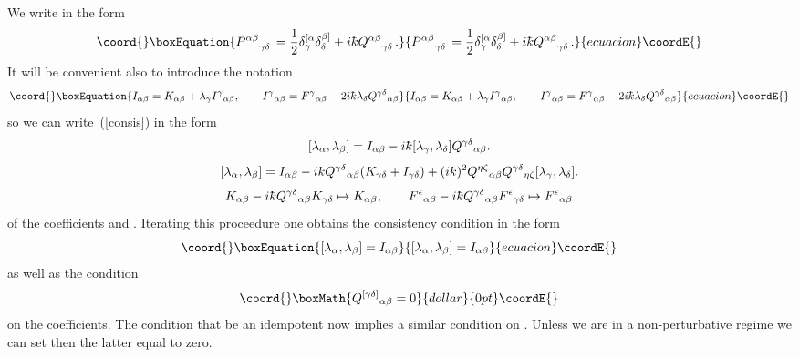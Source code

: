 \documentclass[12pt,a4paper]{article}
\newcounter{eg}
\def\kbar{{\mathchar'26\mkern-9muk}}
\begin{document}
We write \coordHE{} in the form
\begin{equation}\coord{}\boxEquation{
P^{\alpha\beta}{}^{\phantom{\alpha\beta}}_{\gamma\delta} = 
\frac 12 \delta^{[\alpha}_\gamma \delta^{\beta]}_\delta +
i\kbar Q^{\alpha\beta}{}^{\phantom{\alpha\beta}}_{\gamma\delta}.     \label{P}
}{
P^{\alpha\beta}{}^{\phantom{\alpha\beta}}_{\gamma\delta} = 
\frac 12 \delta^{[\alpha}_\gamma \delta^{\beta]}_\delta +
i\kbar Q^{\alpha\beta}{}^{\phantom{\alpha\beta}}_{\gamma\delta}.     }{ecuacion}\coordE{}\end{equation}
It will be convenient also to introduce the notation
\begin{equation}\coord{}\boxEquation{
I_{\alpha\beta} = 
K_{\alpha\beta} + \lambda_\gamma I^\gamma{}_{\alpha\beta}, \qquad
I^\gamma{}_{\alpha\beta} = F^\gamma{}_{\alpha\beta} - 
2i\kbar\lambda_\delta Q^{\gamma\delta}{}_{\alpha\beta}          \label{Gab}
}{
I_{\alpha\beta} = 
K_{\alpha\beta} + \lambda_\gamma I^\gamma{}_{\alpha\beta}, \qquad
I^\gamma{}_{\alpha\beta} = F^\gamma{}_{\alpha\beta} - 
2i\kbar\lambda_\delta Q^{\gamma\delta}{}_{\alpha\beta}          }{ecuacion}\coordE{}\end{equation}
so we can write~(\ref{consis}) in the form
$$
[\lambda_\alpha, \lambda_\beta] = I_{\alpha\beta} -
i\kbar[\lambda_\gamma, \lambda_\delta]
Q^{\gamma\delta}{}_{\alpha\beta}.                           %
$$\coord{}\coordE{}$$
[\lambda_\alpha, \lambda_\beta] = I_{\alpha\beta} -
i\kbar Q^{\gamma\delta}{}_{\alpha\beta}
(K_{\gamma\delta} + I_{\gamma\delta}) + (i\kbar)^2
Q^{\eta\zeta}{}_{\alpha\beta}  Q^{\gamma\delta}{}_{\eta\zeta}
[\lambda_\gamma, \lambda_\delta].
$$\coord{}\coordE{}$$
K_{\alpha\beta} - i\kbar Q^{\gamma\delta}{}_{\alpha\beta} K_{\gamma\delta}
\mapsto K_{\alpha\beta}, \qquad
F^\epsilon{}_{\alpha\beta} - 
i\kbar Q^{\gamma\delta}{}_{\alpha\beta} F^\epsilon{}_{\gamma\delta}
\mapsto F^\epsilon{}_{\alpha\beta}
$$
of the coefficients \coordHE{} and \coordHE{}.
Iterating this proceedure one obtains the consistency condition in the 
form
\begin{equation}\coord{}\boxEquation{
[\lambda_\alpha, \lambda_\beta] = I_{\alpha\beta}            \label{consis2}
}{
[\lambda_\alpha, \lambda_\beta] = I_{\alpha\beta}            }{ecuacion}\coordE{}\end{equation}
as well as the condition
$$\coord{}\boxMath{
Q^{[\gamma\delta]}{}_{\alpha\beta} = 0 
}{dollar}{0pt}\coordE{}$$
on the coefficients. The condition that
\coordHE{} be an idempotent now implies a
similar condition on \myHighlight{$i\kbar Q^{(\gamma\delta)}{}_{(\alpha\beta)}$}\coordHE{}.
Unless we are in a non-perturbative regime we can set then the latter
equal to zero.
\end{document}
